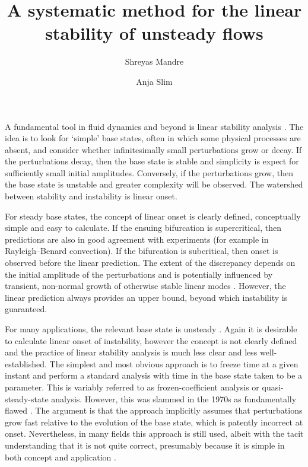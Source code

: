 \documentclass[letterpaper,prl,aps,preprint,superscriptaddress]{revtex4-1}
\begin{document}
\title{A systematic method for the linear stability of unsteady flows}
\author{Shreyas Mandre}
\author{Anja Slim}

\maketitle


A fundamental tool in fluid dynamics and beyond is linear stability analysis \cite{DrazinReid}.  The idea is to look for `simple' base states, often in which some physical processes are absent, and consider whether infinitesimally small perturbations grow or decay.  If the perturbations decay, then the base state is stable and simplicity is expect for sufficiently small initial amplitudes.  Conversely, if the perturbations grow, then the base state is unstable and greater complexity will be observed.  The watershed between stability and instability is linear onset.  

For steady base states, the concept of linear onset is clearly defined, conceptually simple and easy to calculate.  If the ensuing bifurcation is supercritical, then predictions are also in good agreement with experiments (for example in Rayleigh--Benard convection).  If the bifurcation is subcritical, then onset is observed before the linear prediction.   The extent of the discrepancy depends on the initial amplitude of the perturbations and is potentially influenced by transient, non-normal growth of otherwise stable linear modes \cite{Trefethen}.  However, the linear prediction always provides an upper bound, beyond which instability is guaranteed.  

For many applications, the relevant base state is unsteady \cite{lots of refs to various fields}.  Again it is desirable to calculate linear onset of instability, however the concept is not clearly defined and the practice of linear stability analysis is much less clear and less well-established.  The simplest and most obvious approach is to freeze time at a given instant and perform a standard analysis with time in the base state taken to be a parameter.  This is variably referred to as frozen-coefficient analysis or quasi-steady-state analysis.  However, this was slammed in the 1970s as fundamentally flawed \cite{GreshoSani71,Homsy}.  The argument is that the approach implicitly assumes that perturbations grow fast relative to the evolution of the base state, which is patently incorrect at onset.  Nevertheless, in many fields this approach is still used, albeit with the tacit understanding that it is not quite correct, presumably because it is simple in both concept and application \cite{Meiburg,BertozziBrenner}.
\end{document}
